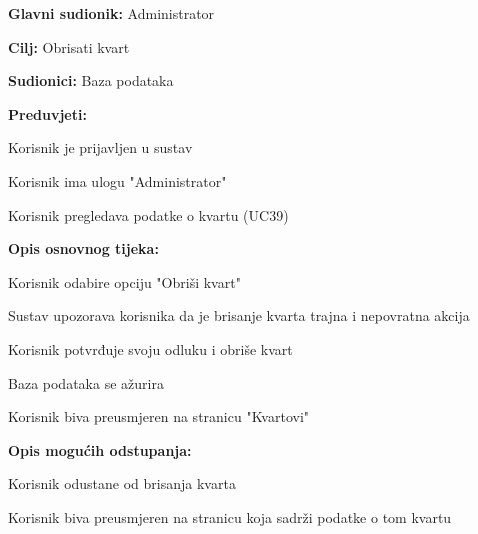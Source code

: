 					\noindent {}
					\begin{packed_item}
	
						\item \textbf{Glavni sudionik: }Administrator
						\item  \textbf{Cilj:} Obrisati kvart
						\item  \textbf{Sudionici:} Baza podataka
						\item  \textbf{Preduvjeti:}
						\item[] \begin{packed_enum}
							\item Korisnik je prijavljen u sustav
							\item Korisnik ima ulogu "Administrator"
							\item Korisnik pregledava podatke o kvartu (UC39)
						\end{packed_enum}
						\item  \textbf{Opis osnovnog tijeka:}
						
						\item[] \begin{packed_enum}
	
							\item Korisnik odabire opciju "Obriši kvart"
							\item Sustav upozorava korisnika da je brisanje kvarta trajna i nepovratna akcija
							\item Korisnik potvrđuje svoju odluku i obriše kvart
							\item Baza podataka se ažurira
							\item Korisnik biva preusmjeren na stranicu "Kvartovi"
						\end{packed_enum}
						
						\item  \textbf{Opis mogućih odstupanja:}
						
						\item[] \begin{packed_item}
	
							\item[3.a] Korisnik odustane od brisanja kvarta
							\item[] \begin{packed_enum}
								
								\item Korisnik biva preusmjeren na stranicu koja sadrži podatke o tom kvartu
								
							\end{packed_enum}
							
						\end{packed_item}
					\end{packed_item}
						
